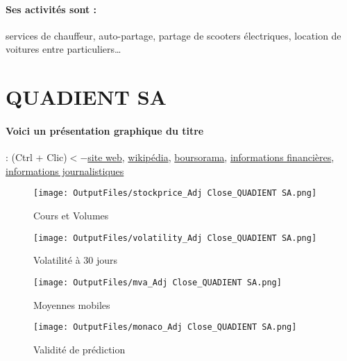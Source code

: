 \documentclass[11pt,a4paper]{report}%
\begin{document}
\paragraph{Ses activités sont : } services de chauffeur, auto-partage, partage de scooters électriques, location de voitures entre particuliers… 
    
    \newpage

\section{QUADIENT SA}

\paragraph{Voici un présentation graphique du titre} : (Ctrl + Clic)$<-$\href{https://invest.quadient.com/}{site web}, \href{https://fr.wikipedia.org/wiki/Quadient}{wikipédia}, \href{https://www.boursorama.com/cours/1rPQDT}{boursorama}, \href{https://www.qwant.com/?q=site:https:%2f%2fwww.easybourse.com%2faction-societe%2fQUADIENT-SA&t=web&client=ext-firefox-hp}{informations financières}, \href{https://bourse.lerevenu.com/cours-de-bourse/fiche-valeur-synthese/QUADIENT-SA/QDT-FR}{informations journalistiques}
\begin{figure}[!htb]
   \begin{minipage}{0.5\textwidth}
     \centering
     \texttt{[image: OutputFiles/stockprice\_Adj Close\_QUADIENT SA.png]}
     \caption{Cours et Volumes}\label{Fig:price_QUADIENT SA}
   \end{minipage}\hfill
   \begin{minipage}{0.5\textwidth}
     \centering
     \texttt{[image: OutputFiles/volatility\_Adj Close\_QUADIENT SA.png]}
     \caption{Volatilité à 30 jours}\label{Fig:volat_QUADIENT SA}
   \end{minipage}
\end{figure}
\begin{figure}[!htb]
   \begin{minipage}{0.5\textwidth}
     \centering
     \texttt{[image: OutputFiles/mva\_Adj Close\_QUADIENT SA.png]}
     \caption{Moyennes mobiles}\label{Fig:mva_QUADIENT SA}
   \end{minipage}\hfill
   \begin{minipage}{0.5\textwidth}
     \centering
     \texttt{[image: OutputFiles/monaco\_Adj Close\_QUADIENT SA.png]}
     \caption{Validité de prédiction}\label{Fig:prediction_QUADIENT SA}
   \end{minipage}
\end{figure}
\end{document}
